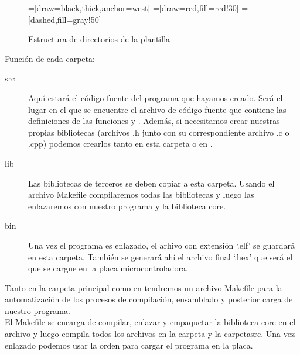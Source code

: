 \begin{figure}[H]
\begin{center}
=[draw=black,thick,anchor=west]
=[draw=red,fill=red!30]
=[dashed,fill=gray!50]
\end{center}
\caption{Estructura de directorios de la plantilla}
\label{plantilla_carpetas}
\end{figure}

Función de cada carpeta:
\begin{description}
	\item[src] Aquí estará el código fuente del programa que hayamos creado. Será el lugar en el que se encuentre el archivo de código fuente  que contiene las definiciones de las funciones  y . Además, si necesitamos crear nuestras propias bibliotecas (archivos .h junto con su correspondiente archivo .c o .cpp) podemos crearlos tanto en esta carpeta o en .
	\item[lib] Las bibliotecas de terceros se deben copiar a esta carpeta. Usando el archivo Makefile compilaremos todas las bibliotecas y luego las enlazaremos con nuestro programa y la biblioteca core.
	\item[bin] Una vez el programa es enlazado, el arhivo con extensión `.elf' se guardará en esta carpeta. También se generará ahí el archivo final `.hex' que será el que se cargue en la placa microcontroladora.
\end{description}

Tanto en la carpeta principal como en  tendremos un archivo Makefile para la automatización de los procesos de compilación, ensamblado y posterior carga de nuestro programa.\\
El Makefile se encarga de compilar, enlazar y empaquetar la biblioteca core en el archivo  y luego compila todos los archivos en la carpeta  y la carpeta{src}. Una vez enlazado podemos usar la orden  para cargar el programa en la placa.

